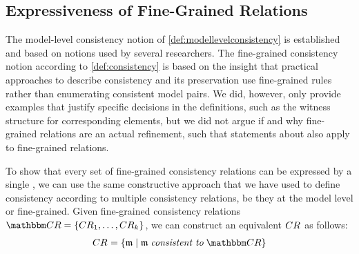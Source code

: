 \subsection{Expressiveness of Fine-Grained Relations} %

The model-level consistency notion of \autoref{def:modellevelconsistency} is established and based on notions used by several researchers.
The fine-grained consistency notion according to \autoref{def:consistency} is based on the insight that practical approaches to describe consistency and its preservation use fine-grained rules rather than enumerating consistent model pairs.
We did, however, only provide examples that justify specific decisions in the definitions, such as the witness structure for corresponding elements, but we did not argue if and why fine-grained relations are an actual refinement, such that statements about \modellevelconsistencyrelations also apply to fine-grained relations.

To show that every set of fine-grained consistency relations can be expressed by a single \modellevelconsistencyrelation, we can use the same constructive approach that we have used to define consistency according to multiple consistency relations, be they at the model level or fine-grained.
Given fine-grained consistency relations $\consistencyrelationset{CR} = \setted{\consistencyrelation{CR}{1}, \dots, \consistencyrelation{CR}{k}}$, we can construct an equivalent \modellevelconsistencyrelation $\consistencyrelation{CR}{}$ as follows:
\begin{align*}
    \consistencyrelation{CR}{} = \setted{\modeltuple{m} \mid \modeltuple{m} \consistenttomath \consistencyrelationset{CR}}
\end{align*}

